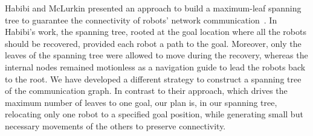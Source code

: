 Habibi and McLurkin presented an approach to build a maximum-leaf
spanning tree to guarantee the connectivity of robots' network
communication~\cite{HabMcL14}.
%
In Habibi's work, the spanning tree, rooted at the goal location where
all the robots should be recovered, provided each robot a path to the
goal. 
%
Moreover, only the leaves of the spanning tree were allowed to move during
the recovery, whereas the internal nodes remained motionless as a
navigation guide to lead the robots back to the root.
%
We have developed a different strategy to construct a spanning tree of the communication
graph. 
%
In contrast to their approach, which drives the maximum number of leaves to
one goal, our plan is, in our spanning tree, 
relocating only one robot to a specified goal position, 
while generating small but
necessary movements of the others to preserve connectivity.


